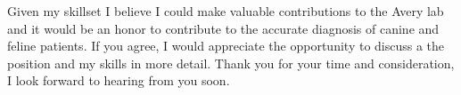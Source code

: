 \documentclass[11pt,a4paper,sans]{moderncv}
\begin{document}
\begin{spacing}{1.1}
Given my skillset I believe I could make valuable contributions to the Avery lab and it would be an honor to contribute to the accurate diagnosis of canine and feline patients. 
If you agree, I would appreciate the opportunity to discuss a the position and my skills in more detail. 
Thank you for your time and consideration, I look forward to hearing from you soon.


 

\end{spacing}
\makeletterclosing
\end{document}

